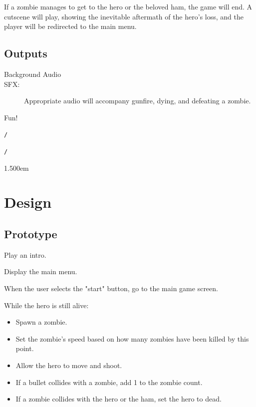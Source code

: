\documentclass[12pt]{article}
\begin{document}
   If a zombie manages to get to the hero or the beloved ham, the game will end. A cutscene will 
   play, showing the inevitable aftermath of the hero's loss, and the player will be redirected 
   to the main menu. \\
   
   \subsection{Outputs}
   \begin{description}
   \item[Background Audio]
   \item[SFX: ] Appropriate audio will accompany gunfire, dying, and defeating a zombie.
   \item[Fun!]
   \end{description}
   
    \rm\mc 

\noindent
{\tt *}{\tt /}
\tt\mc 

\noindent
{}\tt\mc {\tt /}{\tt /}

\noindent
{\tt /}{\tt *}{\tt *}

\noindent
\kern1.500em  \section{Design}
   
   \subsection{Prototype}
   
   \begin{description}
   \item Play an intro.
   \item Display the main menu.
   \item When the user selects the "start" button, go to the main game screen.
   \item While the hero is still alive:
   	\begin{itemize}
   	\item Spawn a zombie.
   	\item Set the zombie's speed based on how many zombies have been killed by this point.
   	\item Allow the hero to move and shoot.
   	\item If a bullet collides with a zombie, add 1 to the zombie count.
   	\item If a zombie collides with the hero or the ham, set the hero to dead.
   	\end{itemize}
   \end{description}
   
\end{document}
